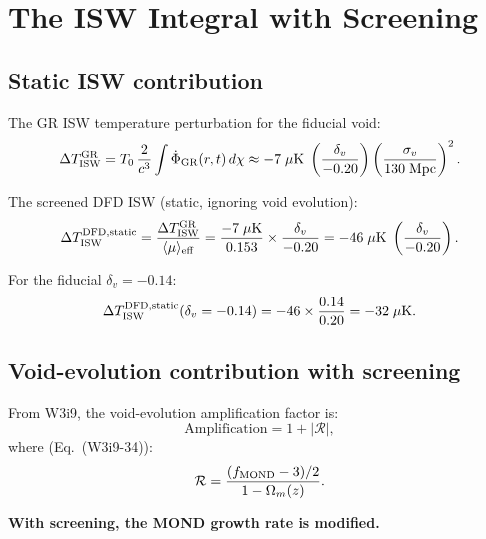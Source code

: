 \documentclass[11pt,a4paper]{article}
\newcommand{\mufd}{\mu}
\newcommand{\Omm}{\Omega_m}
\begin{document}
\section{The ISW Integral with Screening}
\label{sec:ISW-integral}

\subsection{Static ISW contribution}

The GR ISW temperature perturbation for the fiducial void:
\begin{equation}
\Delta T_{\rm ISW}^{\rm GR} = T_0\,\frac{2}{c^3}\int
\dot{\Phi}_{\rm GR}(r,t)\,d\chi
\approx -7\;\mu\text{K}\;\left(\frac{\delta_v}{-0.20}\right)
\left(\frac{\sigma_v}{130\;\text{Mpc}}\right)^2.
\label{eq:ISW-GR}
\end{equation}

The screened DFD ISW (static, ignoring void evolution):
\begin{equation}
\Delta T_{\rm ISW}^{\rm DFD,static}
= \frac{\Delta T_{\rm ISW}^{\rm GR}}{\langle\mufd\rangle_{\rm eff}}
= \frac{-7\;\mu\text{K}}{0.153}
\times\frac{\delta_v}{-0.20}
= -46\;\mu\text{K}\;\left(\frac{\delta_v}{-0.20}\right).
\label{eq:ISW-static-screened}
\end{equation}

For the fiducial $\delta_v = -0.14$:
\begin{equation}
\Delta T_{\rm ISW}^{\rm DFD,static}(\delta_v = -0.14)
= -46 \times \frac{0.14}{0.20} = -32\;\mu\text{K}.
\end{equation}


\subsection{Void-evolution contribution with screening}

From W3i9, the void-evolution amplification factor is:
\begin{equation}
\text{Amplification} = 1 + |\mathcal{R}|,
\end{equation}
where (Eq.\ (W3i9-34)):
\begin{equation}
\mathcal{R} = \frac{(f_{\rm MOND} - 3)/2}{1 - \Omm(z)}.
\end{equation}

\textbf{With screening, the MOND growth rate is modified.}
\end{document}
